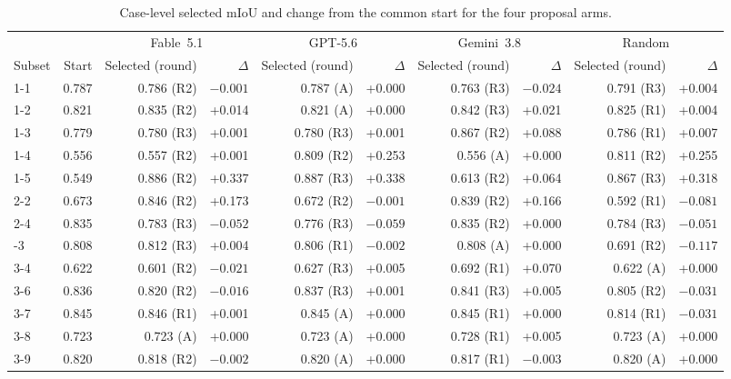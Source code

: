 \documentclass[a4paper,fleqn]{cas-dc}
\begin{document}
\begin{table}[t]
\caption{Case-level selected mIoU and change from the common start for the four proposal arms.}\label{tab:poc-selection-rounds}
\centering
\scriptsize
\setlength{\tabcolsep}{2.5pt}
\begin{tabular*}{\textwidth}{@{\extracolsep{\fill}} l r rr rr rr rr}
\toprule
& & \multicolumn{2}{c}{Fable~5.1} & \multicolumn{2}{c}{GPT-5.6} & \multicolumn{2}{c}{Gemini~3.8} & \multicolumn{2}{c}{Random} \\
\cmidrule(lr){3-4}\cmidrule(lr){5-6}\cmidrule(lr){7-8}\cmidrule(lr){9-10}
Subset & Start & Selected (round) & $\Delta$ & Selected (round) & $\Delta$ & Selected (round) & $\Delta$ & Selected (round) & $\Delta$ \\
\midrule
1-1 & 0.787 & 0.786 (R2) & $-0.001$ & 0.787 (A) & +0.000 & 0.763 (R3) & $-0.024$ & 0.791 (R3) & +0.004 \\
1-2 & 0.821 & 0.835 (R2) & +0.014 & 0.821 (A) & +0.000 & 0.842 (R3) & +0.021 & 0.825 (R1) & +0.004 \\
1-3 & 0.779 & 0.780 (R3) & +0.001 & 0.780 (R3) & +0.001 & 0.867 (R2) & +0.088 & 0.786 (R1) & +0.007 \\
1-4 & 0.556 & 0.557 (R2) & +0.001 & 0.809 (R2) & +0.253 & 0.556 (A) & +0.000 & 0.811 (R2) & +0.255 \\
1-5 & 0.549 & 0.886 (R2) & +0.337 & 0.887 (R3) & +0.338 & 0.613 (R2) & +0.064 & 0.867 (R3) & +0.318 \\
2-2 & 0.673 & 0.846 (R2) & +0.173 & 0.672 (R2) & $-0.001$ & 0.839 (R2) & +0.166 & 0.592 (R1) & $-0.081$ \\
2-4 & 0.835 & 0.783 (R3) & $-0.052$ & 0.776 (R3) & $-0.059$ & 0.835 (R2) & +0.000 & 0.784 (R3) & $-0.051$ \\
\addlinespace
3-3 & 0.808 & 0.812 (R3) & +0.004 & 0.806 (R1) & $-0.002$ & 0.808 (A) & +0.000 & 0.691 (R2) & $-0.117$ \\
3-4 & 0.622 & 0.601 (R2) & $-0.021$ & 0.627 (R3) & +0.005 & 0.692 (R1) & +0.070 & 0.622 (A) & +0.000 \\
3-6 & 0.836 & 0.820 (R2) & $-0.016$ & 0.837 (R3) & +0.001 & 0.841 (R3) & +0.005 & 0.805 (R2) & $-0.031$ \\
3-7 & 0.845 & 0.846 (R1) & +0.001 & 0.845 (A) & +0.000 & 0.845 (R1) & +0.000 & 0.814 (R1) & $-0.031$ \\
3-8 & 0.723 & 0.723 (A) & +0.000 & 0.723 (A) & +0.000 & 0.728 (R1) & +0.005 & 0.723 (A) & +0.000 \\
3-9 & 0.820 & 0.818 (R2) & $-0.002$ & 0.820 (A) & +0.000 & 0.817 (R1) & $-0.003$ & 0.820 (A) & +0.000 \\

\end{tabular*}
\end{table}
\end{document}
